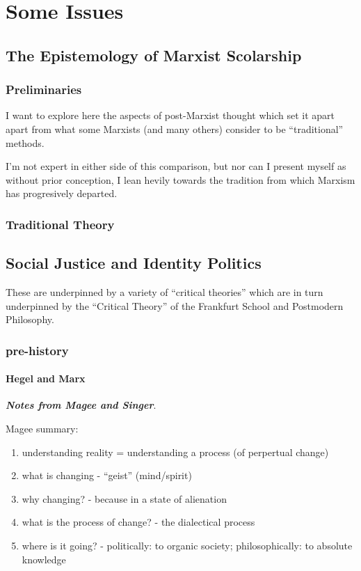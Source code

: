 \documentclass[10pt,titlepage]{book}
\begin{document}
\chapter{Some Issues}

\section{The Epistemology of Marxist Scolarship}

\subsection{Preliminaries}

I want to explore here the aspects of post-Marxist thought which set it apart apart from what some Marxists (and many others) consider to be ``traditional'' methods.

I'm not expert in either side of this comparison, but nor can I present myself as without prior conception, I lean hevily towards the tradition from which Marxism has progresively departed.

\subsection{Traditional Theory}


\section{Social Justice and Identity Politics}

These are underpinned by a variety of ``critical theories'' which are in turn underpinned by the ``Critical Theory'' of the Frankfurt School and Postmodern Philosophy.

\subsection{pre-history}

\subsubsection{Hegel and Marx}

{\bf\emph{Notes from Magee and Singer}}.\label{Sin-Heg}

Magee\cite{magee-singer} summary:

\begin{enumerate}
\item understanding reality = understanding a process (of perpertual change)
\item what is changing - ``geist'' (mind/spirit)
\item why changing? - because in a state of alienation
\item what is the process of change? - the dialectical process
\item where is it going? - politically: to organic society; philosophically: to absolute knowledge
\end{enumerate}
\end{document}

